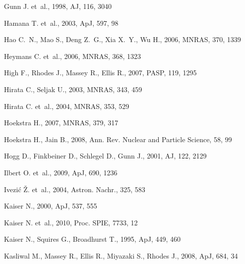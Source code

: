 \documentclass[twocolumn,useAMS,usenatbib]{mn2e}
\begin{document}
\begin{thebibliography}{}
 {Gunn} J. et~al., 1998, AJ, 116, 3040

 {Hamana} T. et~al., 2003, ApJ, 597, 98

{Hao} C.~N., {Mao} S., {Deng} Z.~G., {Xia} X.~Y., {Wu} H., 2006,
MNRAS, 370, 1339

 {Heymans} C. et~al., 2006, MNRAS, 368, 1323

 {High} F., {Rhodes} J., {Massey} R., {Ellis} R., 2007, PASP, 119, 1295

 {Hirata} C., {Seljak} U., 2003, MNRAS, 343, 459

 {Hirata} C. et~al., 2004, MNRAS, 353, 529

 {Hoekstra} H., 2007, MNRAS, 379, 317

{Hoekstra} H., {Jain} B., 2008, Ann. Rev. Nuclear and Particle
Science, 58, 99

 {Hogg} D., {Finkbeiner} D., {Schlegel} D., {Gunn} J., 2001, AJ, 122, 2129

 {Ilbert} O. et~al., 2009, ApJ, 690, 1236

 {Ivezi{\'c}} {\v Z}. et~al., 2004, Astron. Nachr., 325, 583

 {Kaiser} N., 2000, ApJ, 537, 555

 {Kaiser} N. et~al., 2010, Proc. SPIE, 7733, 12

 {Kaiser} N., {Squires} G., {Broadhurst} T., 1995, ApJ, 449, 460

 {Kasliwal} M., {Massey} R., {Ellis} R., {Miyazaki} S., {Rhodes} J., 2008, ApJ, 684, 34


\end{thebibliography}
\end{document}
